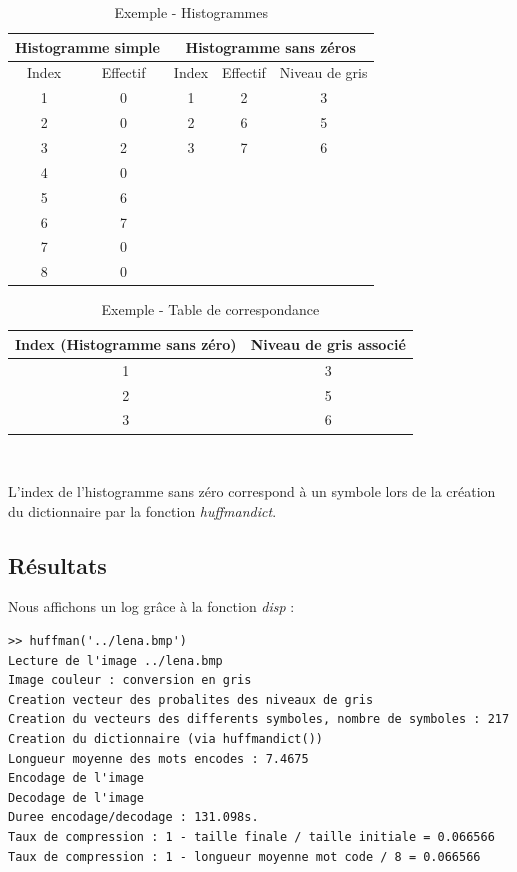 \documentclass[a4paper, 12pt]{article}
\begin{document}
\begin{table}[!h]
	\centering
		\begin{tabular}{|c c|c c c|}
			\hline 
			\multicolumn{2}{|c|}{Histogramme simple} & \multicolumn{3}{|c|}{ Histogramme sans zéros } \\
			\hline Index & Effectif & Index & Effectif & Niveau de gris\\
			\hline
						1 & 0 & 1  & 2 & 3 \\
						2 & 0 & 2  & 6 & 5\\
						3 & 2 & 3  & 7 & 6\\
						4 & 0 &  & &  \\
						5 & 6 &  & &  \\
						6 & 7 &  & &  \\
						7 & 0 &  & & 	\\
						8 & 0 &  & & 	\\
			\hline
		\end{tabular}
	\caption{Exemple - Histogrammes}
	\label{tab:Histogrammes}
	\vspace{1cm}
\end{table}




\begin{table}[!h]
	\centering
		\begin{tabular}{|c|c|}
			\hline 
				Index (Histogramme sans zéro) & Niveau de gris associé \\
			\hline 
				1 & 3 \\
				2 & 5 \\
				3 & 6 \\
			\hline
		\end{tabular} \\
	\caption{Exemple - Table de correspondance}
	\label{tab:TableDeCorrespondance}
\end{table}

	L'index de l'histogramme sans zéro correspond à un symbole lors de la création du dictionnaire par la fonction \textit{huffmandict}.


\subsection{Résultats}

Nous affichons un log grâce à la fonction \textit{disp} :

\begin{verbatim}
>> huffman('../lena.bmp')
Lecture de l'image ../lena.bmp
Image couleur : conversion en gris
Creation vecteur des probalites des niveaux de gris
Creation du vecteurs des differents symboles, nombre de symboles : 217
Creation du dictionnaire (via huffmandict())
Longueur moyenne des mots encodes : 7.4675
Encodage de l'image
Decodage de l'image
Duree encodage/decodage : 131.098s.
Taux de compression : 1 - taille finale / taille initiale = 0.066566
Taux de compression : 1 - longueur moyenne mot code / 8 = 0.066566
\end{verbatim}
\end{document}
